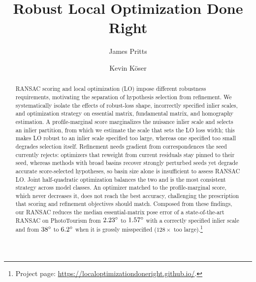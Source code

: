 \documentclass[runningheads]{llncs}
\begin{document}
\title{Robust Local Optimization Done Right}


\author{James Pritts \and Kevin K\"oser}

\maketitle

\begin{abstract}
	RANSAC scoring and local optimization (LO) impose different robustness
	requirements, motivating the separation of hypothesis selection from
	refinement. We systematically isolate the effects of robust-loss shape,
	incorrectly specified inlier scales, and optimization strategy on essential matrix,
	fundamental matrix, and homography estimation. A profile-marginal score
	marginalizes the nuisance inlier scale and selects an inlier partition,
	from which we estimate the scale that sets the LO loss width; this makes
	LO robust to an inlier scale specified too large, whereas one specified too small degrades selection itself.
	Refinement needs gradient from correspondences the seed currently rejects:
	optimizers that reweight from current residuals stay pinned to their seed,
	whereas methods with broad basins recover strongly perturbed seeds yet
	degrade accurate score-selected hypotheses, so basin size alone is
	insufficient to assess RANSAC LO. Joint half-quadratic optimization
	balances the two and is the most consistent strategy across model classes.
	An optimizer matched to the profile-marginal score, which never decreases
	it, does not reach the best accuracy, challenging the prescription that
	scoring and refinement objectives should match. Composed from these
	findings, our RANSAC reduces the median essential-matrix pose error of a
	state-of-the-art RANSAC on PhotoTourism from $2.23^\circ$ to $1.57^\circ$ with a correctly specified inlier scale and
	from $38^\circ$ to $6.2^\circ$ when it is grossly misspecified ($128\times$ too large).\footnote{Project page: \url{https://localoptimizationdoneright.github.io/}.}

\end{abstract}
\end{document}
